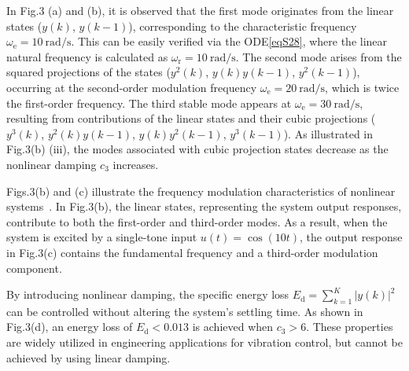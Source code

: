 In Fig.3 (a) and (b), it is observed that the first mode originates from the linear states ($y(k)$, $y(k-1)$), corresponding to the characteristic frequency $\omega_\text{e}=10\ \text{rad/s}$. This can be easily verified via the ODE\ref{eqS28}, where the linear natural frequency is calculated as ${\omega_\text{r}}=10\ \text{rad/s}$.  The second mode arises from the squared projections of the states (${{y}^{2}}(k)$, $y(k)y(k-1)$, ${{y}^{2}}(k-1)$), occurring at the second-order modulation frequency ${\omega_\text{e}}=20\ \text{rad/s}$, which is twice the first-order frequency. The third stable mode appears at ${\omega_\text{e}}=30\ \text{rad/s}$, resulting from contributions of the linear states and their cubic projections (${{y}^{3}}(k)$, ${{y}^{2}}(k)y(k-1)$, $y(k){{y}^{2}}(k-1)$, ${{y}^{3}}(k-1)$). As illustrated in Fig.3(b) (iii), the modes associated with cubic projection states decrease as the nonlinear damping ${c}_{3}$ increases.

Figs.3(b) and (c) illustrate the frequency modulation characteristics of nonlinear systems~\cite{lang1996output}. In Fig.3(b), the linear states, representing the system output responses, contribute to both the first-order and third-order modes. As a result, when the system is excited by a single-tone input $u(t)=\cos(10t)$, the output response in Fig.3(c) contains the fundamental frequency and a third-order modulation component.

By introducing nonlinear damping, the specific energy loss ${E}_\text{d}=\sum\nolimits_{k=1}^{K}{{{\left| y(k) \right|}^{2}}}$ can be controlled without altering the system's settling time. As shown in Fig.3(d), an energy loss of ${{E}_\text{d}}<0.013$ is achieved when ${c}_{3}>6$. These properties are widely utilized in engineering applications for vibration control, but cannot be achieved by using linear damping.

